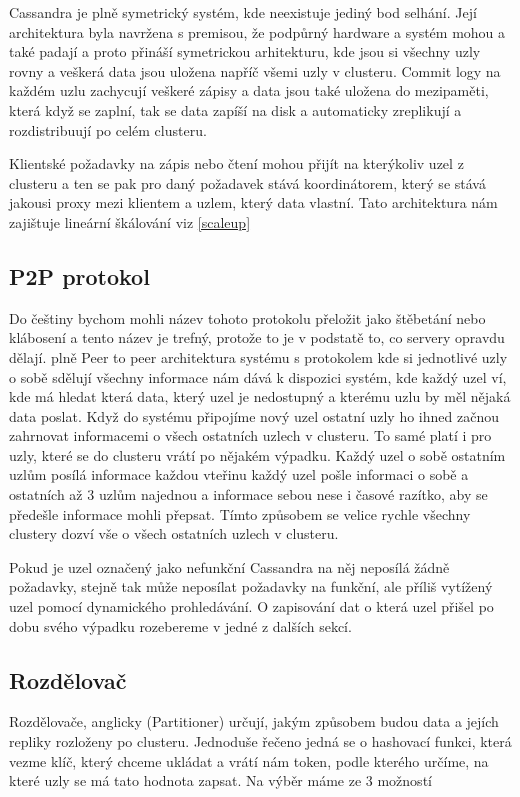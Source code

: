 Cassandra je plně symetrický systém, kde neexistuje jediný bod selhání. Její architektura byla navržena s premisou, že podpůrný hardware a systém mohou a také padají a proto přináší symetrickou arhitekturu, kde jsou si všechny uzly rovny a veškerá data jsou uložena napříč všemi uzly v clusteru. Commit logy na každém uzlu zachycují veškeré zápisy a data jsou také uložena do mezipaměti, která když se zaplní, tak se data zapíší na disk a automaticky zreplikují a rozdistribuují po celém clusteru. 

Klientské požadavky na zápis nebo čtení mohou přijít na kterýkoliv uzel z clusteru a ten se pak pro daný požadavek stává koordinátorem, který se stává jakousi proxy mezi klientem a uzlem, který data vlastní. Tato architektura nám zajištuje lineární škálování viz \ref{scaleup}

\subsection{P2P protokol }
Do češtiny bychom mohli název tohoto protokolu přeložit jako štěbetání nebo klábosení a tento název je trefný, protože to je v podstatě to, co servery opravdu dělají. plně Peer to peer architektura systému s protokolem kde si jednotlivé uzly o sobě sdělují všechny informace nám dává k dispozici systém, kde každý uzel ví, kde má hledat která data, který uzel je nedostupný a kterému uzlu by měl nějaká data poslat. Když do systému připojíme nový uzel ostatní uzly ho ihned začnou zahrnovat informacemi o všech ostatních uzlech v clusteru. To samé platí i pro uzly, které se do clusteru vrátí po nějakém výpadku. Každý uzel o sobě ostatním uzlům posílá informace každou vteřinu každý uzel pošle informaci o sobě a ostatních až 3 uzlům najednou a informace sebou nese i časové razítko, aby se předešle informace mohli přepsat. Tímto způsobem se velice rychle všechny clustery dozví vše o všech ostatních uzlech v clusteru. 

Pokud je uzel označený jako nefunkční Cassandra na něj neposílá žádně požadavky, stejně tak může neposílat požadavky na funkční, ale příliš vytížený uzel pomocí dynamického prohledávání. O zapisování dat o která uzel přišel po dobu svého výpadku rozebereme v jedné z dalších sekcí. 

\subsection{Rozdělovač}
Rozdělovače, anglicky (Partitioner) určují, jakým způsobem budou data a jejích repliky rozloženy po clusteru. Jednoduše řečeno jedná se o hashovací funkci, která vezme klíč, který chceme ukládat a vrátí nám token, podle kterého určíme, na které uzly se má tato hodnota zapsat. Na výběr máme ze 3 možností

